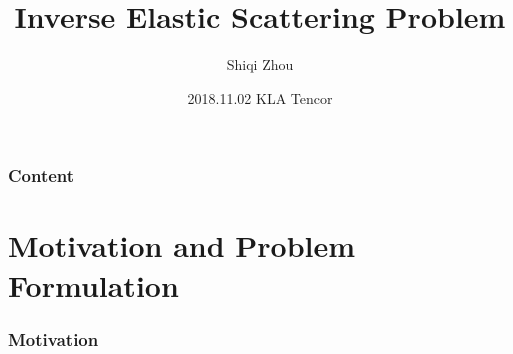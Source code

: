 \documentclass[cjk,8pt]{beamer}
\begin{document}
\begin{CJK*}{GBK}{kai}
\CJKtilde
\title[]{Inverse Elastic Scattering Problem}

\author[]{Shiqi Zhou}
\date[]{2018.11.02 KLA Tencor}




\begin{frame}
  \titlepage
\end{frame}

\begin{frame}
  \frametitle{Content}
  \setcounter{tocdepth}{1}
  \tableofcontents%
\end{frame}

\section{Motivation and Problem Formulation}

\begin{frame}
\frametitle{Motivation}
\begin{figure}


\end{figure}
\end{frame}
\end{CJK*}
\end{document}
